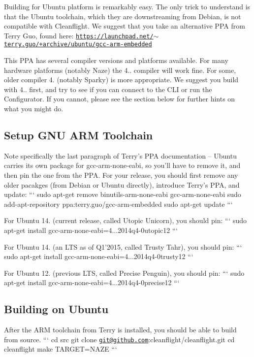 Building for Ubuntu platform is remarkably easy. The only trick to understand is that the Ubuntu toolchain, which they are downstreaming from Debian, is not compatible with Cleanflight. We suggest that you take an alternative P\+P\+A from Terry Guo, found here\+: \href{https://launchpad.net/~terry.guo/+archive/ubuntu/gcc-arm-embedded}{\tt https\+://launchpad.\+net/$\sim$terry.\+guo/+archive/ubuntu/gcc-\/arm-\/embedded}

This P\+P\+A has several compiler versions and platforms available. For many hardware platforms (notably Naze) the 4.. compiler will work fine. For some, older compiler 4. (notably Sparky) is more appropriate. We suggest you build with 4.. first, and try to see if you can connect to the C\+L\+I or run the Configurator. If you cannot, please see the section below for further hints on what you might do.

\subsection*{Setup G\+N\+U A\+R\+M Toolchain}

Note specifically the last paragraph of Terry's P\+P\+A documentation -- Ubuntu carries its own package for {\ttfamily gcc-\/arm-\/none-\/eabi}, so you'll have to remove it, and then pin the one from the P\+P\+A. For your release, you should first remove any older pacakges (from Debian or Ubuntu directly), introduce Terry's P\+P\+A, and update\+: ``` sudo apt-\/get remove binutils-\/arm-\/none-\/eabi gcc-\/arm-\/none-\/eabi sudo add-\/apt-\/repository ppa\+:terry.\+guo/gcc-\/arm-\/embedded sudo apt-\/get update ```

For Ubuntu 14. (current release, called Utopic Unicorn), you should pin\+: ``` sudo apt-\/get install gcc-\/arm-\/none-\/eabi=4...\+2014q4-\/0utopic12 ```

For Ubuntu 14. (an L\+T\+S as of Q1'2015, called Trusty Tahr), you should pin\+: ``` sudo apt-\/get install gcc-\/arm-\/none-\/eabi=4...\+2014q4-\/0trusty12 ```

For Ubuntu 12. (previous L\+T\+S, called Precise Penguin), you should pin\+: ``` sudo apt-\/get install gcc-\/arm-\/none-\/eabi=4...\+2014q4-\/0precise12 ```

\subsection*{Building on Ubuntu}

After the A\+R\+M toolchain from Terry is installed, you should be able to build from source. ``` cd src git clone \href{mailto:git@github.com}{\tt git@github.\+com}\+:cleanflight/cleanflight.\+git cd cleanflight make T\+A\+R\+G\+E\+T=N\+A\+Z\+E ```

